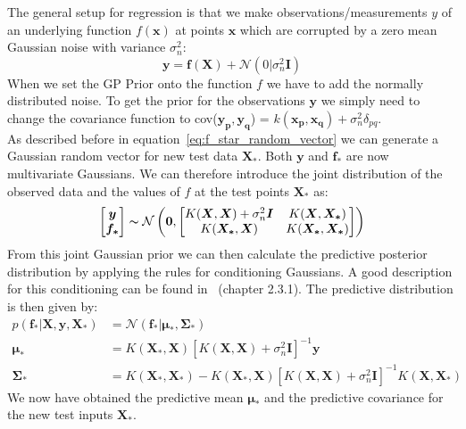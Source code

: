 \documentclass{article}
\begin{document}
The general setup for regression is that we make observations/measurements $y$ of an underlying function $f(\bm{x})$ at points $\bm{x}$ which are corrupted by a zero mean Gaussian noise with variance $\sigma_n^2$:
\begin{equation}
    \bm{y} = \bm{f}(\bm{X}) + \mathcal{N}(0|\sigma_n^2 \bm{I})
\end{equation}
When we set the GP Prior onto the function $f$ we have to add the normally distributed noise. To get the prior for the observations $\bm{y}$ we simply need to change the covariance function to cov($\bm{y_p,y_q}$) = $k(\bm{x_p,x_q}) + \sigma_n^2\delta_{pq}$.\\
As described before in equation~\ref{eq:f_star_random_vector} we can generate a Gaussian random vector for new test data $\bm{X_*}$. Both $\bm{y}$ and $\bm{f_*}$ are now multivariate Gaussians. We can therefore introduce the joint distribution of the observed data and the values of $f$ at the test points $\bm{X_*}$ as:
\begin{equation}
    \label{eq:joint_f,X_*}
    \begin{aligned}
        \begin{bmatrix}
            \bm{y}\\
            \bm{f_*}
        \end{bmatrix}
        \thicksim  \mathcal{N}\left(\bm{0},
        \begin{bmatrix}
            K(\bm{X},\bm{X}) + \sigma_n^2 \bm{I} & K(\bm{X},\bm{X_*})\\
            K(\bm{X_*},\bm{X}) & K(\bm{X_*},\bm{X_*})
        \end{bmatrix}
        \right)
    \end{aligned}
\end{equation}
From this joint Gaussian prior we can then calculate the predictive posterior distribution by applying the rules for conditioning Gaussians. A good description for this conditioning can be found in~\cite{bishop} (chapter 2.3.1). The predictive distribution is then given by:
\begin{equation}
    \begin{aligned}
        \label{eq:general_kernel}
        p(\bm{f_*}|\bm{X},\bm{y},\bm{X_*}) &= \mathcal{N}(\bm{f_*|\bm{\mu_*}},\bm{\Sigma_*})\\
        \bm{\mu_*} &=  K(\bm{X_*},\bm{X}){[K(\bm{X},\bm{X}) + \sigma_n^2 \bm{I}]}^{-1} \bm{y}\\
        \bm{\Sigma_*} &= K(\bm{X_*},\bm{X_*}) - K(\bm{X_*},\bm{X}){[K(\bm{X},\bm{X}) + \sigma_n^2 \bm{I}]}^{-1}K(\bm{X},\bm{X_*})
    \end{aligned}
\end{equation}
We now have obtained the predictive mean $\bm{\mu_*}$ and the predictive covariance for the new test inputs $\bm{X_*}$.
\end{document}
